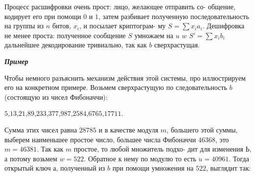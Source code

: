 Процесс расшифровки очень прост: лицо, желающее отправить со­-\linebreak
общение, кодирует его при помощи $0$ и $1$, затем разбивает полученную\linebreak
последовательность на группы из $n$ битов, $x_i$, и посылает криптограм-\linebreak­
му $S = \sum x_i a_i$. Дешифровка не менее проста: полученное сообщение\linebreak
$S$ умножаем на $u$ $w$ $S' = \sum x_i b_i$
дальнейшее декодирование тривиально, так как $b$ сверхрастущая.

\noindent\textbf{\textit{Пример}}

Чтобы немного разъяснить механизм действия этой системы, про­
иллюстрируем его на конкретном примере. Возьмем сверхрастущую по­
следовательность $b$ (состоящую из чисел Фибоначчи):

\begin{center}
$5$,\;\;\;\;\;$13$,\;\;\;\;\;$21$,\;\;\;\;\;$89$,\;\;\;\;\;$233$,\;\;\;\;\;$377$,\;\;\;\;\;$987$,\;\;\;\;\;$2 584$,\;\;\;\;\;$6 765$,\;\;\;\;\;$17 711$.
\end{center}

\noindent Сумма этих чисел равна $28 785$ и в качестве модуля $m$, большего этой\linebreak
суммы, выберем наименьшее простое число, большее числа Фибоначчи\linebreak
$46368$, это $m = 46381$. Так как $m$ простое, то любой множитель подхо­-\linebreak
дит для изменения $Ь$, а потому возьмем $w = 522$. Обратное к нему по\linebreak
модулю то есть $u = 40961$. Тогда открытый ключ $а$, полученный из $b$\linebreak
при помощи умножения на $522$, выглядит так:

